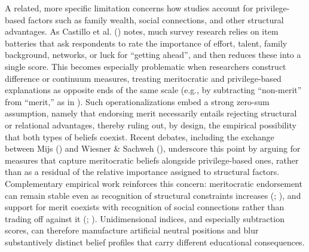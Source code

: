 \documentclass[
  13pt,
]{article}
\begin{document}
A related, more specific limitation concerns how studies account for
privilege-based factors such as family wealth, social connections, and
other structural advantages. As Castillo et al.
() notes, much survey
research relies on item batteries that ask respondents to rate the
importance of effort, talent, family background, networks, or luck for
``getting ahead'', and then reduces these into a single score. This
becomes especially problematic when researchers construct difference or
continuum measures, treating meritocratic and privilege-based
explanations as opposite ends of the same scale (e.g., by subtracting
``non-merit'' from ``merit,'' as in
). Such
operationalizations embed a strong zero-sum assumption, namely that
endorsing merit necessarily entails rejecting structural or relational
advantages, thereby ruling out, by design, the empirical possibility
that both types of beliefs coexist. Recent debates, including the
exchange between Mijs () and
Wiesner \& Sachweh (),
underscore this point by arguing for measures that capture meritocratic
beliefs alongside privilege-based ones, rather than as a residual of the
relative importance assigned to structural factors. Complementary
empirical work reinforces this concern: meritocratic endorsement can
remain stable even as recognition of structural constraints increases
(;
), and support
for merit coexists with recognition of social connections rather than
trading off against it
(;
). Unidimensional
indices, and especially subtraction scores, can therefore manufacture
artificial neutral positions and blur substantively distinct belief
profiles that carry different educational consequences.
\end{document}
